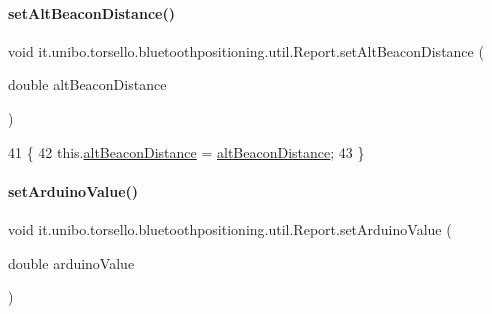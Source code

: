 \paragraph{\texorpdfstring{set\+Alt\+Beacon\+Distance()}{setAltBeaconDistance()}}
{\footnotesize\ttfamily void it.\+unibo.\+torsello.\+bluetoothpositioning.\+util.\+Report.\+set\+Alt\+Beacon\+Distance (\begin{DoxyParamCaption}\item[{double}]{alt\+Beacon\+Distance }\end{DoxyParamCaption})}


\begin{DoxyCode}
41                                                                \{
42         this.\hyperlink{classit_1_1unibo_1_1torsello_1_1bluetoothpositioning_1_1util_1_1Report_aad81754844fb8364075ab69052730a98_aad81754844fb8364075ab69052730a98}{altBeaconDistance} = \hyperlink{classit_1_1unibo_1_1torsello_1_1bluetoothpositioning_1_1util_1_1Report_aad81754844fb8364075ab69052730a98_aad81754844fb8364075ab69052730a98}{altBeaconDistance};
43     \}
\end{DoxyCode}
\hypertarget{classit_1_1unibo_1_1torsello_1_1bluetoothpositioning_1_1util_1_1Report_aae184f911da626881b5648d75e6e8dac_aae184f911da626881b5648d75e6e8dac}{}\label{classit_1_1unibo_1_1torsello_1_1bluetoothpositioning_1_1util_1_1Report_aae184f911da626881b5648d75e6e8dac_aae184f911da626881b5648d75e6e8dac} 
\paragraph{\texorpdfstring{set\+Arduino\+Value()}{setArduinoValue()}}
{\footnotesize\ttfamily void it.\+unibo.\+torsello.\+bluetoothpositioning.\+util.\+Report.\+set\+Arduino\+Value (\begin{DoxyParamCaption}\item[{double}]{arduino\+Value }\end{DoxyParamCaption})}


